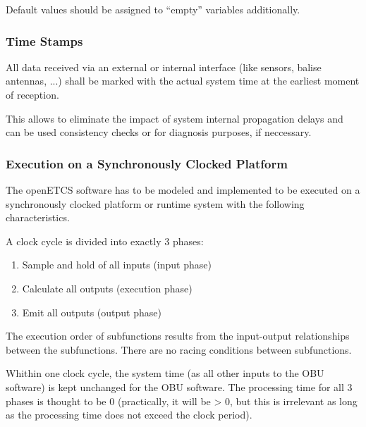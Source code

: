 Default values should be assigned to “empty” variables additionally.

\subsubsection{Time Stamps}

All data received via an external or internal interface (like sensors, balise antennas, ...) shall be marked with the actual system time at the earliest moment of reception.

This allows to eliminate the impact of system internal propagation delays and can be used consistency checks or for diagnosis purposes, if neccessary.

\subsubsection{Execution on a Synchronously Clocked Platform}

The openETCS software has to be modeled and implemented to be executed on a synchronously clocked platform or runtime system with the following characteristics.

A clock cycle is divided into exactly 3 phases: 

\begin{enumerate}
	\item Sample and hold of all inputs (input phase)
	\item Calculate all outputs (execution phase)
	\item Emit all outputs (output phase)
\end{enumerate}

The execution order of subfunctions results from the input-output relationships between the subfunctions. There are no racing conditions between subfunctions.

Whithin one clock cycle, the system time (as all other inputs to the OBU software) is kept unchanged for the OBU software. The processing time for all 3 phases is thought to be 0 (practically, it will be > 0, but this is irrelevant as long as the processing time does not exceed the clock period).

